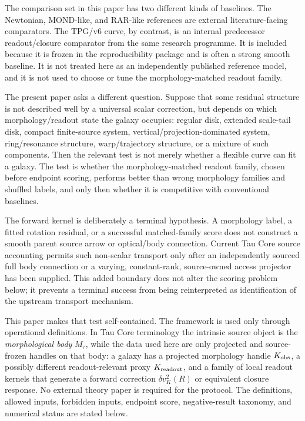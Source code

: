 \documentclass[11pt]{article}
\begin{document}
The comparison set in this paper has two different kinds of baselines.  The
Newtonian, MOND-like, and RAR-like references are external literature-facing
comparators.  The TPG/v6 curve, by contrast, is an internal predecessor
readout/closure comparator from the same research programme.  It is included
because it is frozen in the reproducibility package and is often a strong
smooth baseline.  It is not treated here as an independently published
reference model, and it is not used to choose or tune the morphology-matched
readout family.

The present paper asks a different question.  Suppose that some residual
structure is not described well by a universal scalar correction, but depends on
which morphology/readout state the galaxy occupies: regular disk, extended
scale-tail disk, compact finite-source system, vertical/projection-dominated
system, ring/resonance structure, warp/trajectory structure, or a mixture of such
components.  Then the relevant test is not merely whether a flexible curve can
fit a galaxy.  The test is whether the morphology-matched readout family,
chosen before endpoint scoring, performs better than wrong morphology families
and shuffled labels, and only then whether it is competitive with conventional
baselines.

The forward kernel is deliberately a terminal hypothesis. A morphology label,
a fitted rotation residual, or a successful matched-family score does not
construct a smooth parent source arrow or optical/body connection. Current
Tau Core source accounting permits such non-scalar transport only after an
independently sourced full body connection or a varying, constant-rank,
source-owned access projector has been supplied. This added boundary does not
alter the scoring problem below; it prevents a terminal success from being
reinterpreted as identification of the upstream transport mechanism.

This paper makes that test self-contained.  The framework is used only through
operational definitions.  In Tau Core terminology the intrinsic source object is
the \emph{morphological body} \(M_\tau\), while the data used here are only
projected and source-frozen handles on that body: a galaxy has a projected morphology handle
\(K_{\rm obs}\), a possibly different readout-relevant proxy
\(K_{\rm readout}\), and a family of local readout kernels that generate a
forward correction \(\delta v_K^2(R)\) or equivalent closure response.  No
external theory paper is required for the protocol.  The definitions, allowed
inputs, forbidden inputs, endpoint score, negative-result taxonomy, and
numerical status are stated below.
\end{document}
